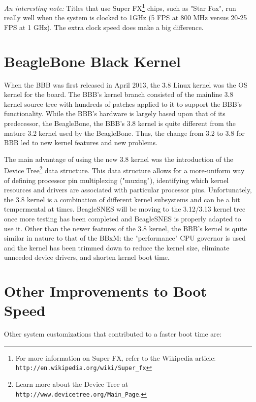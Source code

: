 \emph{An interesting note:} Titles that use Super FX\footnote{For more information on Super FX, refer to the Wikipedia article: \texttt{http://en.wikipedia.org/wiki/Super\_fx}} chips, such as "Star Fox", run really well when the system is clocked to 1GHz (5 FPS at 800 MHz versus 20-25 FPS at 1 GHz). The extra clock speed does make a big difference.

\section{BeagleBone Black Kernel}

When the BBB was first released in April 2013, the 3.8 Linux kernel was the OS kernel for the board.  The BBB's kernel branch consisted of the mainline 3.8 kernel source tree with hundreds of patches applied to it to support the BBB's functionality.  While the BBB's hardware is largely based upon that of its predecessor, the BeagleBone, the BBB's 3.8 kernel is quite different from the mature 3.2 kernel used by the BeagleBone.  Thus, the change from 3.2 to 3.8 for BBB led to new kernel features and new problems.

The main advantage of using the new 3.8 kernel was the introduction of the Device Tree\footnote{Learn more about the Device Tree at \texttt{http://www.devicetree.org/Main\_Page}.} data structure. This data structure allows for a more-uniform way of defining processor pin multiplexing ("muxing"), identifying which kernel resources and drivers are associated with particular processor pins.  Unfortunately, the 3.8 kernel is a combination of different kernel subsystems and can be a bit tempermental at times.  BeagleSNES will be moving to the 3.12/3.13 kernel tree once more testing has been completed and BeagleSNES is properly adapted to use it.  Other than the newer features of the 3.8 kernel, the BBB's kernel is quite similar in nature to that of the BBxM: the "performance" CPU governor is used and the kernel has been trimmed down to reduce the kernel size, eliminate unneeded device drivers, and shorten kernel boot time.

\section{Other Improvements to Boot Speed}

Other system customizations that contributed to a faster boot time are:

